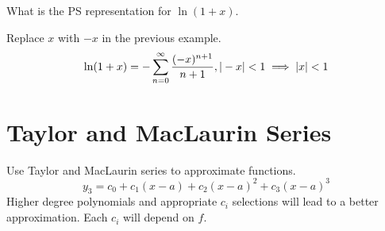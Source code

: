 \documentclass[english, 12pt]{article}
\begin{document}
\begin{exmp}
What is the PS representation for $\ln (1+x)$.
\begin{sol}
Replace $x$ with $-x$ in the previous example.
\[ \ln (1+x) = - \sum_{n=0}^\infty \frac{(-x)^{n+1}}{n+1} , | -x| < 1 \implies |x| < 1\]
\end{sol}
\end{exmp}
\section{Taylor and MacLaurin Series}
Use Taylor and MacLaurin series to approximate functions.
\[y_{3} = c_{0} + c_{1} (x-a) + c_{2} (x-a)^2 + c_{3} (x-a)^3\]
Higher degree polynomials and appropriate $c_{i}$ selections will lead to a better approximation. Each $c_{i}$ will depend on $f$.
\end{document}
